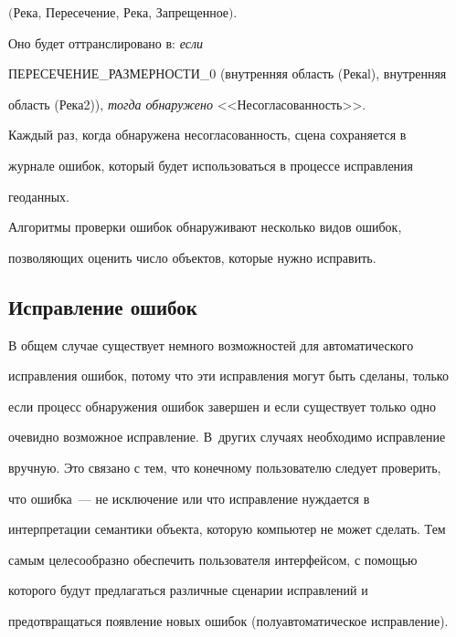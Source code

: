     $\mathrm{(Река}$, $\mathrm{Пересечение}$, $\mathrm{Река}$, $\mathrm{Запрещенное})$.


Оно будет оттранслировано в: \textit{если} 


ПЕРЕСЕЧЕНИЕ\_РАЗМЕРНОСТИ\_0 (внутренняя область (Рекаl), внутренняя 


область (Река2)), \textit{тогда обнаружено} <<Несогласованность>>. 


    


    Каждый раз, когда обнаружена несогласованность, сцена сохраняется в 


журнале ошибок, который будет использоваться в процессе исправления 


геоданных. 


    


    Алгоритмы проверки ошибок обнаруживают несколько видов ошибок, 


позволяющих оценить число объектов, которые нужно исправить. 





\subsection{Исправление ошибок}


    


    В общем случае существует немного возможностей для автоматического 


исправления ошибок, потому что эти исправления могут быть сделаны, только 


если процесс обнаружения ошибок завершен и если существует только одно 


очевидно возможное исправление. В~других случаях необходимо исправление 


вручную. Это связано с тем, что конечному пользователю следует проверить, 


что ошибка~--- не исключение или что исправление нуждается в 


интерпретации семантики объекта, которую компьютер не может сделать. Тем 


самым целесообразно обеспечить пользователя интерфейсом, с помощью 


которого будут предлагаться различные сценарии исправлений и 


предотвращаться появление новых ошибок (полуавтоматическое исправление). 


